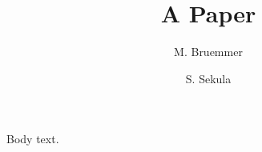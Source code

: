 \documentclass{aipcopy}
\title{A Paper}
\author[aff1]{M. Bruemmer}
\author[aff1]{S. Sekula}
\affil[aff1]{Department of Physics, SMU}
\begin{document}
\maketitle
Body text.
\end{document}
